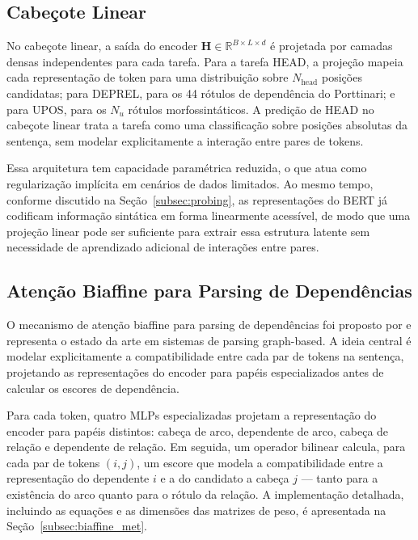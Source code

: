 \subsection{Cabeçote Linear}
\label{subsec:linear}

No cabeçote linear, a saída do encoder $\mathbf{H} \in \mathbb{R}^{B \times L \times d}$ é
projetada por camadas densas independentes para cada tarefa. Para a tarefa HEAD, a projeção
mapeia cada representação de token para uma distribuição sobre $N_{\text{head}}$ posições
candidatas; para DEPREL, para os 44 rótulos de dependência do Porttinari; e para UPOS, para
os $N_u$ rótulos morfossintáticos. A predição de HEAD no cabeçote linear trata a tarefa como
uma classificação sobre posições absolutas da sentença, sem modelar explicitamente a interação
entre pares de tokens.

Essa arquitetura tem capacidade paramétrica reduzida, o que atua como regularização implícita
em cenários de dados limitados. Ao mesmo tempo, conforme discutido na
Seção~\ref{subsec:probing}, as representações do BERT já codificam informação sintática em
forma linearmente acessível, de modo que uma projeção linear pode ser suficiente para extrair
essa estrutura latente sem necessidade de aprendizado adicional de interações entre pares.

\subsection{Atenção Biaffine para Parsing de Dependências}
\label{subsec:biaffine}

O mecanismo de atenção biaffine para parsing de dependências foi proposto por
\citeauthor{dozat2016deep} \cite{dozat2016deep} e representa o estado da arte em sistemas de
parsing graph-based. A ideia central é modelar explicitamente a compatibilidade entre cada
par de tokens na sentença, projetando as representações do encoder para papéis especializados
antes de calcular os escores de dependência.

Para cada token, quatro MLPs especializadas projetam a representação do encoder para papéis
distintos: cabeça de arco, dependente de arco, cabeça de relação e dependente de relação.
Em seguida, um operador bilinear calcula, para cada par de tokens $(i,j)$, um escore que
modela a compatibilidade entre a representação do dependente $i$ e a do candidato a cabeça
$j$ — tanto para a existência do arco quanto para o rótulo da relação. A implementação
detalhada, incluindo as equações e as dimensões das matrizes de peso, é apresentada na
Seção~\ref{subsec:biaffine_met}.

